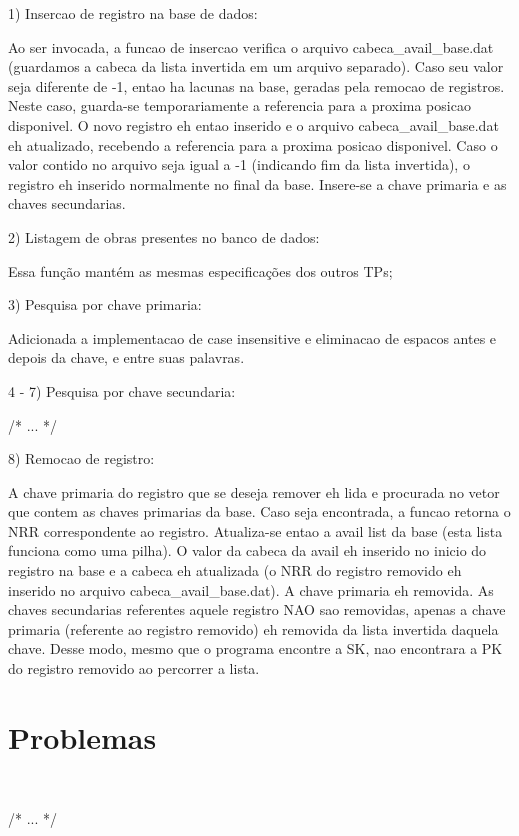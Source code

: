 \documentclass{article}
\begin{document}
1) Insercao de registro na base de dados:

Ao ser invocada, a funcao de insercao verifica o arquivo cabeca_avail_base.dat (guardamos a cabeca da lista invertida em um arquivo separado). 
Caso seu valor seja diferente de -1, entao ha lacunas na base, geradas pela remocao de registros.
Neste caso, guarda-se temporariamente a referencia para a proxima posicao disponivel. O novo registro eh entao inserido e o arquivo cabeca_avail_base.dat eh atualizado, recebendo a referencia para a proxima posicao disponivel.
Caso o valor contido no arquivo seja igual a -1 (indicando fim da lista invertida), o registro eh inserido normalmente no final da base.
Insere-se a chave primaria e as chaves secundarias.



2) Listagem de obras presentes no banco de dados:

Essa função mantém as mesmas especificações dos outros TPs;



3) Pesquisa por chave primaria:

Adicionada a implementacao de case insensitive e eliminacao de espacos antes e depois da chave, e entre suas palavras.



4 - 7) Pesquisa por chave secundaria:

/* ... */


8) Remocao de registro:

A chave primaria do registro que se deseja remover eh lida e procurada no vetor que contem as chaves primarias da base. Caso seja encontrada, a funcao retorna o NRR correspondente ao registro.
Atualiza-se entao a avail list da base (esta lista funciona como uma pilha).
O valor da cabeca da avail eh inserido no inicio do registro na base e a cabeca eh atualizada (o NRR do registro removido eh inserido no arquivo cabeca_avail_base.dat).
A chave primaria eh removida.
As chaves secundarias referentes aquele registro NAO sao removidas, apenas a chave primaria (referente ao registro removido) eh removida da lista invertida daquela chave. Desse modo, mesmo que o programa encontre a SK, nao encontrara a PK do registro removido ao percorrer a lista.



\section{Problemas}\

/* ... */
\end{document}
